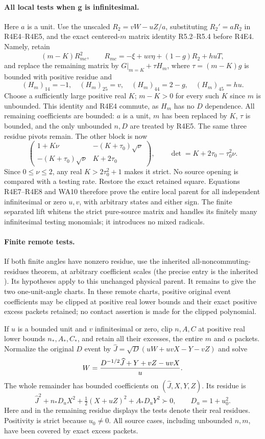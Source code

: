 \paragraph{All local tests when g is infinitesimal.}
Here $a$ is a unit. Use the unscaled $R_2=vW-uZ/a$, substituting
$R_2'=aR_2$ in R4E4--R4E5, and the exact
centered-$m$ matrix identity R5.2--R5.4 before R4E4. Namely, retain
\[
 (m-K)R_{mc}^2,\qquad R_{mc}=-\xi+uv\eta+(1-g)R_2+huT,
\]
and replace the remaining matrix by
$G|_{m=K}+\tau H_m$, where $\tau=(m-K)g$ is bounded with positive
residue and
\[
 (H_m)_{14}=-1,\quad(H_m)_{25}=v,\quad
 (H_m)_{44}=2-g,\quad(H_m)_{45}=hu.
\]
Choose a sufficiently large positive real $K$; $m-K>0$ for every
such $K$ since $m$ is unbounded. This identity and R4E4 commute,
as $H_m$ has no $D$ dependence. All remaining coefficients are
bounded: $a$ is a unit, $m$ has been replaced by $K$, $\tau$ is
bounded, and the only unbounded $n,D$ are treated by R4E5.
The same three residue pivots remain. The other block is now
\[
 \begin{pmatrix}
 1+K\nu&-(K+\tau_0)\sqrt\nu\\
 -(K+\tau_0)\sqrt\nu&K+2\tau_0
 \end{pmatrix},\qquad
 \det=K+2\tau_0-\tau_0^2\nu.                         \tag{R4E8}
\]
Since $0\le\nu\le2$, any real $K>2\tau_0^2+1$ makes it strict.
No source opening is compared with a testing rate. Restore the exact
retained square. Equations R4E7--R4E8 and WA10 therefore prove the
entire local parent for all independent infinitesimal or zero $u,v$,
with arbitrary states and either sign. The finite separated lift
whitens the strict pure-source matrix and handles its finitely many
infinitesimal testing monomials; it introduces no mixed radicals.

\paragraph{Finite remote tests.}
If both finite angles have nonzero residue, use the inherited
all-noncommuting-residues theorem, at arbitrary coefficient scales
(the precise entry is the inherited ).
Its hypotheses apply to this unchanged physical parent. It remains
to give the two one-unit-angle charts. In these remote charts,
positive original event coefficients may be clipped at positive real
lower bounds and their exact positive excess packets retained; no
contact assertion is made for the clipped polynomial.

If $u$ is a bounded unit and $v$ infinitesimal or zero, clip $n,A,C$
at positive real lower bounds $n_*,A_*,C_*$, and retain all their
excesses, the entire $m$ and $\alpha$ packets. Normalize the original
$D$ event by $\widehat J=\sqrt D(uW+uvX-Y-vZ)$ and solve
\[
 W={D^{-1/2}\widehat J+Y+vZ-uvX\over u}.
\]
The whole remainder has bounded coefficients on
$(\widehat J,X,Y,Z)$. Its residue is
\[
 \widehat J^2+n_*D_uX^2+\tfrac12(X+uZ)^2+A_*D_uY^2\succ0,
 \qquad D_u=1+u_0^2.                                \tag{R4E9}
\]
Here and in the remaining residue displays the tests denote their real
residues. Positivity is strict because $u_0\ne0$. All source cases,
including unbounded $n,m$, have been covered by exact excess packets.

